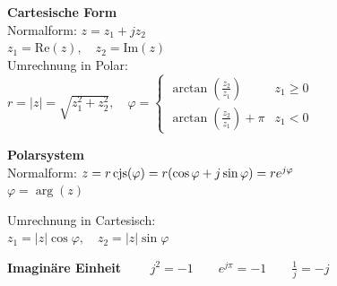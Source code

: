 \begin{minipage}[t]{9.4cm}
	\textbf{Cartesische Form}\\
	Normalform: $z = z_1 +j z_2$\\
	$z_1 = \text{Re}(z), \quad z_2 = \text{Im}(z)$\\
	Umrechnung in Polar:\\
	$r = |z| = \sqrt{z_1^2 + z_2^2}, \quad 
	\varphi = 	\begin{cases} 
                	\arctan(\frac{z_2}{z_1}) &z_1 \geq 0\\
                	\arctan(\frac{z_2}{z_1}) + \pi &z_1 < 0
    			\end{cases}$
\end{minipage}
\begin{minipage}[t]{9.4cm}
	\textbf{Polarsystem}\\
	Normalform: 
	$z = r \operatorname{cjs}(\varphi) = r(\cos{\varphi} + j\sin{\varphi}) = r e^{j \varphi}$\\
	$\varphi = \arg(z)$

	Umrechnung in Cartesisch:\\
	$z_1 = |z| \cos{\varphi}, \quad z_2 = |z| \sin{\varphi}$
\end{minipage}
\begin{center}
{\textbf{Imaginäre Einheit} $\qquad j^2 = -1 \qquad e^{j\pi} = -1 \qquad
\frac{1}{j} = -j$}
\end{center}

